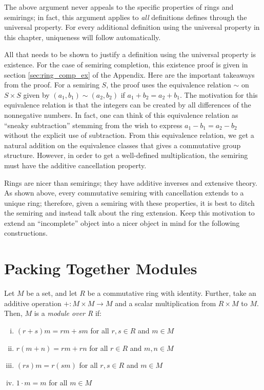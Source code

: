 \documentclass[../sean_thesis.tex]{subfiles}
\begin{document}
The above argument never appeals to the specific properties of rings and semirings; in fact, this argument applies to \emph{all} definitions defines through the universal property. For every additional definition using the universal property in this chapter, uniqueness will follow automatically. 

All that needs to be shown to justify a definition using the universal property is existence. For the case of semiring completion, this existence proof is given in section \ref{sec:ring_comp_ex} of the Appendix. Here are the important takeaways from the proof. For a semiring $S$, the proof uses the equivalence relation $\sim$ on $S \times S$ given by $(a_1,b_1) \sim (a_2,b_2)$ if $a_1 + b_2 = a_2 + b_1$. The motivation for this equivalence relation is that the integers can be created by all differences of the nonnegative numbers. In fact, one can think of this equivalence relation as ``sneaky subtraction'' stemming from the wish to express $a_1 - b_1 = a_2 - b_2$ without the explicit use of subtraction. From this equivalence relation, we get a natural addition on the equivalence classes that gives a commutative group structure. However, in order to get a well-defined multiplication, the semiring must have the additive cancellation property.

Rings are nicer than semirings; they have additive inverses and extensive theory. As shown above, every commutative semiring with cancellation extends to a unique ring; therefore, given a semiring with these properties, it is best to ditch the semiring and instead talk about the ring extension. Keep this motivation to extend an ``incomplete'' object into a nicer object in mind for the following constructions.

\section{Packing Together Modules}



\begin{definition}[Module]
	Let $M$ be a set, and let $R$ be a commutative ring with identity. Further, take an additive operation $+: M \times M \to M$ and a scalar multiplication from $R \times M$ to $M$. Then, $M$ is a \emph{module over R} if:
\vspace{-\varparskip}
	\begin{enumerate}[(i)] 
		\item $(r+s)m = rm+sm$ for all $r,s \in R$ and $m \in M$
		\item $r(m+n) = rm + rn$ for all $r \in R$ and $m,n \in M$
		\item $(rs)m = r(sm)$ for all $r,s \in R$ and $m \in M$
		\item $1\cdot m = m$ for all $m \in M$
	\end{enumerate}
\end{definition}
\end{document}
